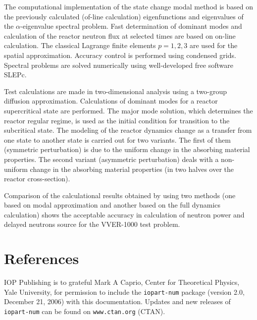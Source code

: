 \documentclass[a4paper]{jpconf}
\begin{document}
The computational implementation of the state change modal method is based on the previously calculated (of-line calculation) eigenfunctions and eigenvalues of the  $\alpha$-eigenvalue spectral problem. Fast determination of dominant modes and calculation of the reactor neutron flux at selected times are based on on-line calculation.
The classical Lagrange finite elements $p=1,2,3$ are used for the spatial approximation. 
Accuracy control is performed using condensed grids. Spectral problems are solved numerically using well-developed free software SLEPc.

Test calculations are made in two-dimensional analysis using a two-group diffusion approximation. Calculations of dominant modes for a reactor supercritical state are performed. The major mode solution, which determines the reactor regular regime, is used as the initial condition for transition to the subcritical state. The modeling of the reactor dynamics change as a transfer from one state to another state is carried out for two variants. The first of them (symmetric perturbation) is due to the uniform change in the absorbing material properties. The second variant (asymmetric perturbation) deals with a non-uniform change in the absorbing material properties (in two halves over the reactor cross-section).

Comparison of the calculational results obtained by using two methods (one based on modal approximation and another based on the full dynamics calculation) shows the acceptable accuracy in calculation of neutron power and delayed neutrons source for the VVER-1000 test problem. 

\section*{References}
\begin{thebibliography}{9}
 IOP Publishing is to grateful Mark A Caprio, Center for Theoretical Physics, Yale University, for permission to include the {\tt iopart-num} \BibTeX package (version 2.0, December 21, 2006) with  this documentation. Updates and new releases of {\tt iopart-num} can be found on \verb"www.ctan.org" (CTAN). 
\end{thebibliography}
\end{document}
